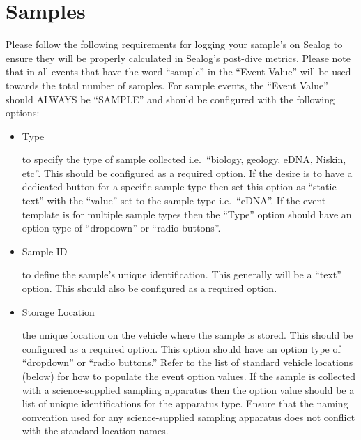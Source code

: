 \documentclass[
  letterpaper,
  DIV=11,
  numbers=noendperiod]{scrreprt}
\begin{document}
\hypertarget{samples}{%
\section{Samples}\label{samples}}

Please follow the following requirements for logging your sample's on
Sealog to ensure they will be properly calculated in Sealog's post-dive
metrics. Please note that in all events that have the word ``sample'' in
the ``Event Value'' will be used towards the total number of samples.
For sample events, the ``Event Value'' should ALWAYS be ``SAMPLE'' and
should be configured with the following options:

\begin{itemize}
\item
  Type

  to specify the type of sample collected i.e.~``biology, geology, eDNA,
  Niskin, etc''. This should be configured as a required option. If the
  desire is to have a dedicated button for a specific sample type then
  set this option as ``static text'' with the ``value'' set to the
  sample type i.e.~``eDNA''. If the event template is for multiple
  sample types then the ``Type'' option should have an option type of
  ``dropdown'' or ``radio buttons''.
\item
  Sample ID

  to define the sample's unique identification. This generally will be a
  ``text'' option. This should also be configured as a required option.
\item
  Storage Location

  the unique location on the vehicle where the sample is stored. This
  should be configured as a required option. This option should have an
  option type of ``dropdown'' or ``radio buttons.'' Refer to the list of
  standard vehicle locations (below) for how to populate the event
  option values. If the sample is collected with a science-supplied
  sampling apparatus then the option value should be a list of unique
  identifications for the apparatus type. Ensure that the naming
  convention used for any science-supplied sampling apparatus does not
  conflict with the standard location names.
\end{itemize}
\end{document}
